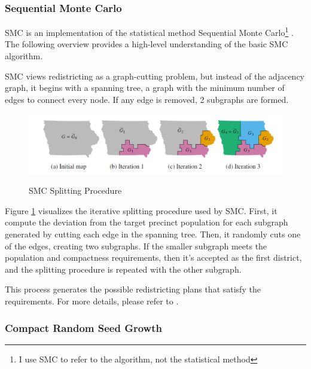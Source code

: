 \subsubsection{Sequential Monte Carlo}
\label{sec:smc}

SMC is an implementation of the statistical method Sequential Monte Carlo\footnote{I use SMC to refer to the algorithm, not the statistical method} \parencite{mccartan2020}. The following overview provides a high-level understanding of the basic SMC algorithm.

SMC views redistricting as a graph-cutting problem, but instead of the adjacency graph, it begins with a spanning tree, a graph with the minimum number of edges to connect every node. If any edge is removed, 2 subgraphs are formed. 

\begin{figure}[hb]
    \caption{SMC Splitting Procedure}
    \includegraphics[width=\linewidth]{img/smc.PNG}
    \label{fig:smc}
    \raggedright
\end{figure}

Figure \ref{fig:smc} visualizes the iterative splitting procedure used by SMC. First, it compute the deviation from the target precinct population for each subgraph generated by cutting each edge in the spanning tree. Then, it randomly cuts one of the edges, creating two subgraphs. If the smaller subgraph meets the population and compactness requirements, then it's accepted as the first district, and the splitting procedure is repeated with the other subgraph. 

This process generates the possible redistricting plans that satisfy the requirements. For more details, please refer to \textcite{mccartan2020}.

\subsubsection{Compact Random Seed Growth}
\label{sec:crsg}

